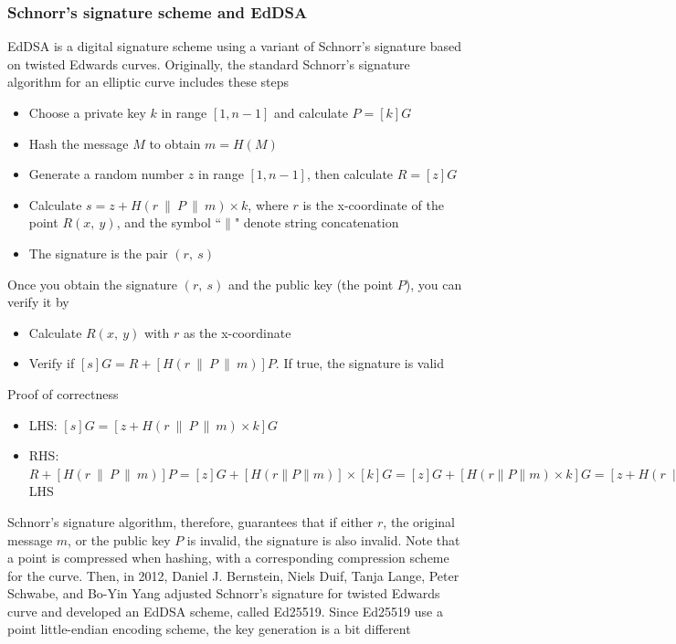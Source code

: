 \subsubsection{Schnorr’s signature scheme and EdDSA}

EdDSA is a digital signature scheme using a variant of Schnorr’s signature based on twisted Edwards curves. Originally, the standard Schnorr’s signature algorithm for an elliptic curve includes these steps

\begin{itemize}
  \item Choose a private key $k$ in range $[1, n -1]$ and calculate $P = [k]G$
  \item Hash the message $M$ to obtain $m = H(M)$
  \item Generate a random number $z$ in range $[1, n -1]$, then calculate $R = [z]G$
  \item Calculate $s = z + H(r \ \| \ P \ \| \ m) \times k$, where $r$ is the x-coordinate of the point $R(x, \ y)$, and the symbol ``$\|$" denote string concatenation
  \item The signature is the pair $(r, \ s)$
\end{itemize}

Once you obtain the signature $(r, \ s)$ and the public key (the point $P$), you can verify it by

\begin{itemize}
  \item Calculate $R(x, \ y)$ with $r$ as the x-coordinate
  \item Verify if $[s]G = R + [H(r \ \| \ P \ \| \ m)]P$. If true, the signature is valid
\end{itemize}

Proof of correctness

\begin{itemize}
  \item LHS: $[s]G = [z + H(r \ \| \ P \ \| \ m) \times k]G$
  \item RHS: $R + [H(r \ \| \ P \ \| \ m)] P = [z]G + [H(r \| P \| m)] \times [k]G = [z]G + [H(r \| P \| m) \times k]G = [z + H(r \ \| \ P \ \| \ m) \times k]G =$ LHS
\end{itemize}

Schnorr’s signature algorithm, therefore, guarantees that if either $r$, the original message $m$, or the public key $P$ is invalid, the signature is also invalid. Note that a point is compressed when hashing, with a corresponding compression scheme for the curve. Then, in 2012, Daniel J. Bernstein, Niels Duif, Tanja Lange, Peter Schwabe, and Bo-Yin Yang adjusted Schnorr’s signature for twisted Edwards curve and developed an EdDSA scheme, called Ed25519. Since Ed25519 use a point little-endian encoding scheme, the key generation is a bit different

